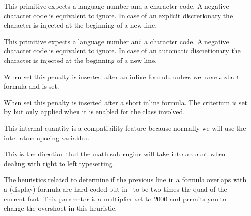 \startnewprimitive[title={\prm {postexhyphenchar}}]

This primitive expects a language number and a character code. A negative
character code is equivalent to ignore. In case of an explicit discretionary the
character is injected at the beginning of a new line.

\stopnewprimitive

\startnewprimitive[title={\prm {posthyphenchar}}]

This primitive expects a language number and a character code. A negative
character code is equivalent to ignore. In case of an automatic discretionary the
character is injected at the beginning of a new line.

\stopnewprimitive

\startnewprimitive[title={\prm {postinlinepenalty}}]

When set this penalty is inserted after an inline formula unless we have a short
formula and  is set.

\stopnewprimitive

\startnewprimitive[title={\prm {postshortinlinepenalty}}]

When set this penalty is inserted after a short inline formula. The criterium is
set by  but only applied when it is enabled for
the class involved.

\stopnewprimitive

\startnewprimitive[title={\prm {prebinoppenalty}}]

This internal quantity is a compatibility feature because normally we will use
the inter atom spacing variables.

\stopnewprimitive

\startoldprimitive[title={\prm {predisplaydirection}}]

This is the direction that the math sub engine will take into account when
dealing with right to left typesetting.

\stopoldprimitive

\startnewprimitive[title={\prm {predisplaygapfactor}}]

The heuristics related to determine if the previous line in a formula overlaps
with a (display) formula are hard coded but in \LUATEX\ to be two times the quad
of the current font. This parameter is a multiplier set to 2000 and permits you
to change the overshoot in this heuristic.

\stopnewprimitive


